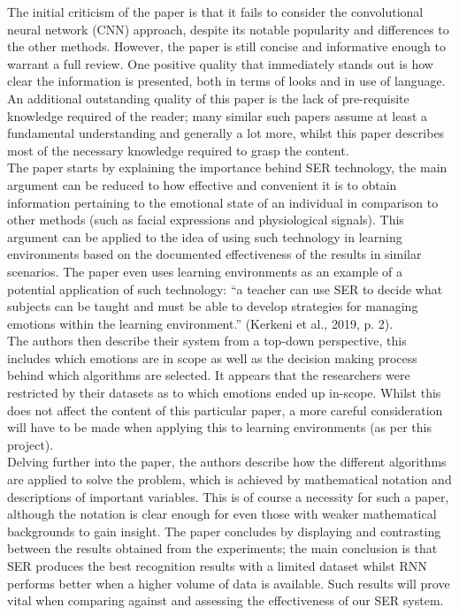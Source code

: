 \documentclass[12pt]{article}
\begin{document}
\noindent The initial criticism of the paper is that it fails to consider the convolutional neural network (CNN) approach, despite its notable popularity and differences to the other methods. However, the paper is still concise and informative enough to warrant a full review. One positive quality that immediately stands out is how clear the information is presented, both in terms of looks and in use of language. An additional outstanding quality of this paper is the lack of pre-requisite knowledge required of the reader; many similar such papers assume at least a fundamental understanding and generally a lot more, whilst this paper describes most of the necessary knowledge required to grasp the content.
\\

\noindent The paper starts by explaining the importance behind SER technology, the main argument can be reduced to how effective and convenient it is to obtain information pertaining to the emotional state of an individual in comparison to other methods (such as facial expressions and physiological signals). This argument can be applied to the idea of using such technology in learning environments based on the documented effectiveness of the results in similar scenarios. The paper even uses learning environments as an example of a potential application of such technology: ``a teacher can use SER to decide what subjects can be taught and must be able to develop strategies for managing emotions within the learning environment.'' (Kerkeni et al., 2019, p. 2).
\\

\noindent The authors then describe their system from a top-down perspective, this includes which emotions are in scope as well as the decision making process behind which algorithms are selected. It appears that the researchers were restricted by their datasets as to which emotions ended up in-scope. Whilst this does not affect the content of this particular paper, a more careful consideration will have to be made when applying this to learning environments (as per this project).
\\

\noindent Delving further into the paper, the authors describe how the different algorithms are applied to solve the problem, which is achieved by mathematical notation and descriptions of important variables. This is of course a necessity for such a paper, although the notation is clear enough for even those with weaker mathematical backgrounds to gain insight. The paper concludes by displaying and contrasting between the results obtained from the experiments; the main conclusion is that SER produces the best recognition results with a limited dataset whilst RNN performs better when a higher volume of data is available. Such results will prove vital when comparing against and assessing the effectiveness of our SER system.
\\
\end{document}
